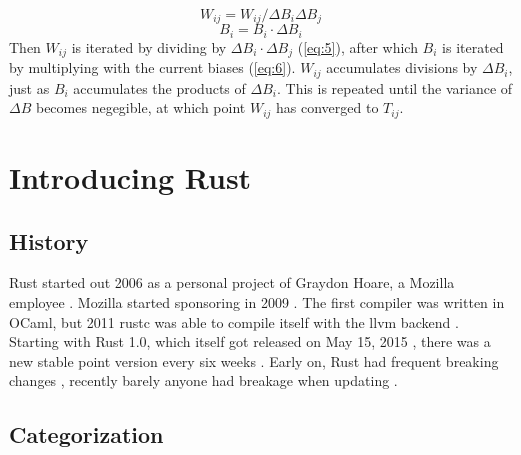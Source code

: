\begin{equation}\label{eq:5}
    W_{ij} = W_{ij} / \Delta B_i \Delta B_j
\end{equation}
\begin{equation}\label{eq:6}
    B_i = B_i \cdot \Delta B_i
\end{equation}
Then $W_{ij}$ is iterated by dividing by $\Delta B_i \cdot \Delta B_j$
(\eqref{eq:5}), after which $B_i$ is iterated by multiplying with the current
biases (\eqref{eq:6}). $W_{ij}$ accumulates divisions by $\Delta B_i$, just as
$B_i$ accumulates the products of $\Delta B_i$. This is repeated until the
variance of $\Delta B$ becomes negegible, at which point $W_{ij}$ has converged
to $T_{ij}$.






\section{Introducing Rust}\label{sec:Rust}

\subsection{History}\label{sec:RustHistory}

Rust started out 2006 as a personal project of Graydon Hoare, a Mozilla
employee \cite{rustbegin}. Mozilla started sponsoring in 2009 \cite{rustbegin}.
The first compiler was written in OCaml, but 2011 rustc was able to compile
itself with the llvm backend \cite{rustcompile}. Starting with Rust 1.0, which
itself got released on May 15, 2015 \cite{rustversions}, there was a new stable
point version every six weeks \cite{rustversions}. Early on, Rust had frequent
breaking changes \cite{rustchanges}, recently barely anyone had breakage when
updating \cite{rustupdate}.

\subsection{Categorization}\label{sec:RustCategory}

